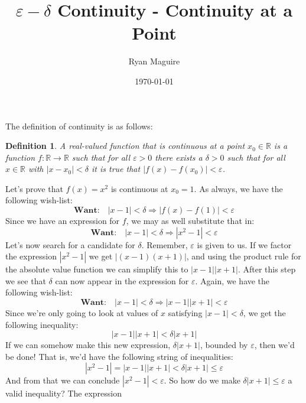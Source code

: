 \documentclass{article}
\title{$\varepsilon-\delta$ Continuity - Continuity at a Point}
\author{Ryan Maguire}
\date{\today}
\theoremstyle{normal}
\newtheorem{definition}{Definition}
\begin{document}
    \maketitle
    The definition of continuity is as follows:
    \begin{definition}
        A real-valued function that is continuous at a point
        $x_{0}\in\mathbb{R}$ is a function $f:\mathbb{R}\rightarrow\mathbb{R}$
        such that for all $\varepsilon>0$ there exists a $\delta>0$ such that
        for all $x\in\mathbb{R}$ with $|x-x_{0}|<\delta$ it is true that
        $|f(x)-f(x_{0})|<\varepsilon$.
    \end{definition}
    Let's prove that $f(x)=x^{2}$ is continuous at $x_{0}=1$. As always, we
    have the following wish-list:
    \begin{equation}
        \textbf{Want:}\quad|x-1|<\delta
        \Rightarrow|f(x)-f(1)|<\varepsilon
    \end{equation}
    Since we have an expression for $f$, we may as well substitute that in:
    \begin{equation}
        \textbf{Want:}\quad|x-1|<\delta
        \Rightarrow|x^{2}-1|<\varepsilon
    \end{equation}
    Let's now search for a candidate for $\delta$. Remember, $\varepsilon$ is
    given to us. If we factor the expression $|x^{2}-1|$ we get
    $|(x-1)(x+1)|$, and using the product rule for the absolute value function
    we can simplify this to $|x-1||x+1|$. After this step we see that $\delta$
    can now appear in the expression for $\varepsilon$. Again, we have the
    following wish-list:
    \begin{equation}
        \textbf{Want:}\quad|x-1|<\delta
        \Rightarrow|x-1||x+1|<\varepsilon
    \end{equation}
    Since we're only going to look at values of $x$ satisfying
    $|x-1|<\delta$, we get the following inequality:
    \begin{equation}
        |x-1||x+1|<\delta|x+1|
    \end{equation}
    If we can somehow make this new expression, $\delta|x+1|$, bounded by
    $\varepsilon$, then we'd be done! That is, we'd
    have the following string of inequalities:
    \begin{equation}
        |x^{2}-1|=|x-1||x+1|<\delta|x+1|\leq\varepsilon
    \end{equation}
    And from that we can conclude $|x^{2}-1|<\varepsilon$. So how do we make
    $\delta|x+1|\leq\varepsilon$ a valid inequality? The expression
\end{document}
